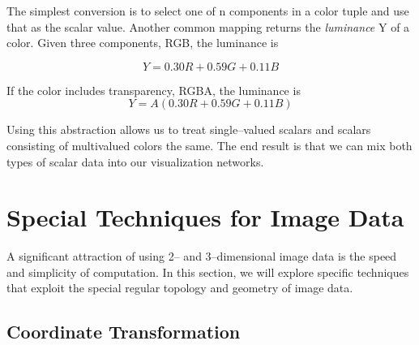 The simplest conversion is to select one of n components in a color tuple and use that as the scalar value. Another common mapping returns the \emph{luminance} Y of a color. Given three components, RGB, the luminance is

\begin{equation}\label{eq:8.26}
Y = 0.30 R + 0.59 G + 0.11 B\end{equation}

If the color includes transparency, RGBA, the luminance is
\begin{equation}\label{eq:8.27}
Y = A(0.30 R + 0.59 G + 0.11 B)
\end{equation}

Using this abstraction allows us to treat single--valued scalars and scalars consisting of multivalued colors the same. The end result is that we can mix both types of scalar data into our visualization networks.

\section{Special Techniques for Image Data}
\label{sec:special_techniques_for_image_data}

A significant attraction of using 2-- and 3--dimensional image data is the speed and simplicity of computation. In this section, we will explore specific techniques that exploit the special regular topology and geometry of image data.

\subsection{Coordinate Transformation}

